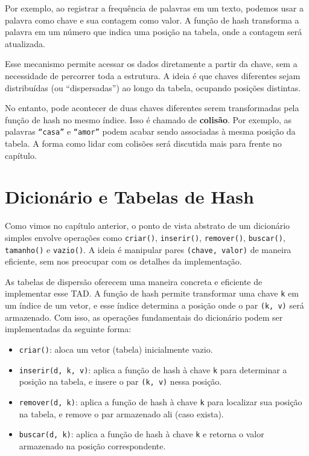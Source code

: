 Por exemplo, ao registrar a frequência de palavras em um texto, podemos usar a palavra como chave e sua contagem como valor. 
A função de hash transforma a palavra em um número que indica uma posição na tabela, onde a contagem será atualizada.

Esse mecanismo permite acessar os dados diretamente a partir da chave, sem a necessidade de percorrer toda a estrutura. 
A ideia é que chaves diferentes sejam distribuídas (ou ``dispersadas'') ao longo da tabela, ocupando posições distintas.

No entanto, pode acontecer de duas chaves diferentes serem transformadas pela função de hash no mesmo índice. 
Isso é chamado de \textbf{colisão}. 
Por exemplo, as palavras \texttt{``casa''} e \texttt{``amor''} podem acabar sendo associadas à mesma posição da tabela. 
A forma como lidar com colisões será discutida mais para frente no capítulo.

\section{Dicionário e Tabelas de Hash}

Como vimos no capítulo anterior, o ponto de vista abstrato de um dicionário simples envolve operações como \texttt{criar()}, \texttt{inserir()}, \texttt{remover()}, \texttt{buscar()}, \texttt{tamanho()} e \texttt{vazio()}. 
A ideia é manipular pares \texttt{(chave, valor)} de maneira eficiente, sem nos preocupar com os detalhes da implementação.

As tabelas de dispersão oferecem uma maneira concreta e eficiente de implementar esse TAD. 
A função de hash permite transformar uma chave \texttt{k} em um índice de um vetor, e esse índice determina a posição onde o par \texttt{(k, v)} será armazenado. 
Com isso, as operações fundamentais do dicionário podem ser implementadas da seguinte forma:

\begin{itemize}
  \item \texttt{criar()}: aloca um vetor (tabela) inicialmente vazio.
  
  \item \texttt{inserir(d, k, v)}: aplica a função de hash à chave \texttt{k} para determinar a posição na tabela, e insere o par \texttt{(k, v)} nessa posição.
  
  \item \texttt{remover(d, k)}: aplica a função de hash à chave \texttt{k} para localizar sua posição na tabela, e remove o par armazenado ali (caso exista).
  
  \item \texttt{buscar(d, k)}: aplica a função de hash à chave \texttt{k} e retorna o valor armazenado na posição correspondente.
\end{itemize}


